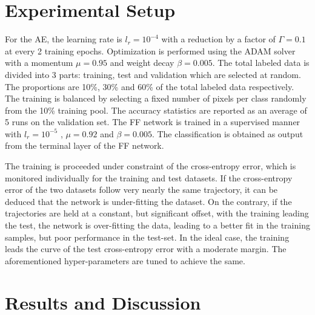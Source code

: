 

\section{Experimental Setup}
\label{sec:airindia_15}
For the AE, the learning rate is $l_r = 10^{-4}$ with a reduction by a factor of $\Gamma = 0.1$ at every 2 training epochs. Optimization is performed using the ADAM solver with a momentum $\mu = 0.95$ and weight decay $\beta = 0.005$. The total labeled data is divided into 3 parts: training, test and validation which are selected at random. The proportions are 10\%, 30\% and 60\% of the total labeled data respectively. The training is balanced by selecting a fixed number of pixels per class randomly from the 10\% training pool. The accuracy statistics are reported as an average of 5 runs on the validation set. The FF network is trained in a supervised manner with $l_r = 10^{-5}$ , $\mu = 0.92$ and $\beta = 0.005$. The classification is obtained as output from the terminal layer of the FF network. 

The training is proceeded under constraint of the cross-entropy error, which is monitored individually for the training and test datasets. If the cross-entropy error of the two datasets follow very nearly the same trajectory, it can be deduced that the network is under-fitting the dataset. On the contrary, if the trajectories are held at a constant, but significant offset, with the training leading the test, the network is over-fitting the data, leading to a better fit in the training samples, but poor performance in the test-set. In the ideal case, the training leads the curve of the test cross-entropy error with a moderate margin. The aforementioned hyper-parameters are tuned to achieve the same. 




\section{Results and Discussion}\label{Sec:ResultsDiscussion}
\label{sec:airindia_5}

